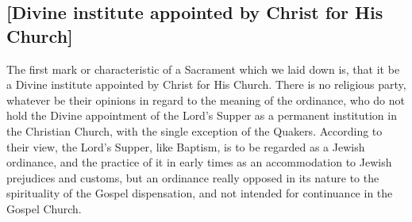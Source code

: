 \documentclass[
  english,
]{book}
\begin{document}
\hypertarget{divine-institute-appointed-by-christ-for-his-church}{%
\subsection{{[}Divine institute appointed by Christ for His Church{]}}\label{divine-institute-appointed-by-christ-for-his-church}}

The first mark or characteristic of a Sacrament which we laid down is, that it be a Divine institute appointed by Christ for His Church. There is no religious party, whatever be their opinions in regard to the meaning of the ordinance, who do not hold the Divine appointment of the Lord's Supper as a permanent institution in the Christian Church, with the single exception of the Quakers. According to their view, the Lord's Supper, like Baptism, is to be regarded as a Jewish ordinance, and the practice of it in early times as an accommodation to Jewish prejudices and customs, but an ordinance really opposed in its nature to the spirituality of the Gospel dispensation, and not intended for continuance in the Gospel Church.
\end{document}
